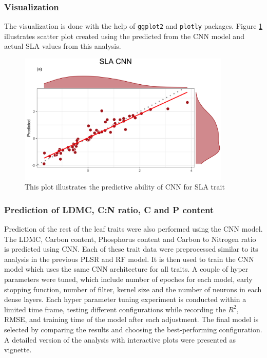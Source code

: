 \documentclass[12pt,a4paper]{report}
\begin{document}
\subsubsection*{Visualization}
The visualization is done with the help of \texttt{ggplot2} and \texttt{plotly} packages. Figure \ref{fig:sla_cnn} illustrates scatter plot created using the predicted from the CNN model and actual SLA values from this analysis.\\

\begin{figure}[h]
    \centering
    \includegraphics[width=0.9\textwidth]{Figures/sla_cnn.png}
    \caption{This plot illustrates the predictive ability of CNN for SLA trait}
    \label{fig:sla_cnn}
\end{figure}

\subsubsection*{Prediction of LDMC, C:N ratio, C and P content}
Prediction of the rest of the leaf traits were also performed using the CNN model. The LDMC, Carbon content, Phosphorus content and Carbon to Nitrogen ratio is predicted using CNN. Each of these trait data were preprocessed similar to its analysis in the previous PLSR and RF model. It is then used to train the CNN model which uses the same CNN architecture for all traits. A couple of hyper parameters were tuned, which include number of epoches for each model, early stopping function, number of filter, kernel size and the number of neurons in each dense layers. Each hyper parameter tuning experiment is conducted within a limited time frame, testing different configurations while recording the $R^2$, RMSE, and training time of the model after each adjustment. The final model is selected by comparing the results and choosing the best-performing configuration. A detailed version of the analysis with interactive plots were presented as vignette. \\
\end{document}
